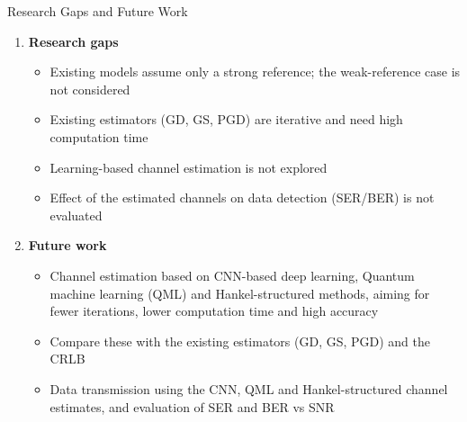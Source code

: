 \documentclass[10pt,xcolor=x11names,compress,aspectratio=169]{beamer}
\begin{document}
\begin{frame}{Research Gaps and Future Work}
\begin{enumerate}\small\setlength\itemsep{8pt}
    \item \textbf{Research gaps}
  \begin{itemize}\small\setlength\itemsep{3pt}
    \item Existing models assume only a strong reference; the weak-reference case is not considered
    \item Existing estimators (GD, GS, PGD) are iterative and need high computation time
    \item Learning-based channel estimation is not explored
    \item Effect of the estimated channels on data detection (SER/BER) is not evaluated
  \end{itemize}

  \item \textbf{Future work}
  \begin{itemize}\small\setlength\itemsep{3pt}
    \item Channel estimation based on CNN-based deep learning, Quantum machine learning (QML) and Hankel-structured methods, aiming for fewer iterations, lower computation time and high accuracy
    \item Compare these with the existing estimators (GD, GS, PGD) and the CRLB
    \item Data transmission using the CNN, QML and Hankel-structured channel estimates, and evaluation of SER and BER vs SNR

  \end{itemize}
\end{enumerate}
\end{frame}
\end{document}
